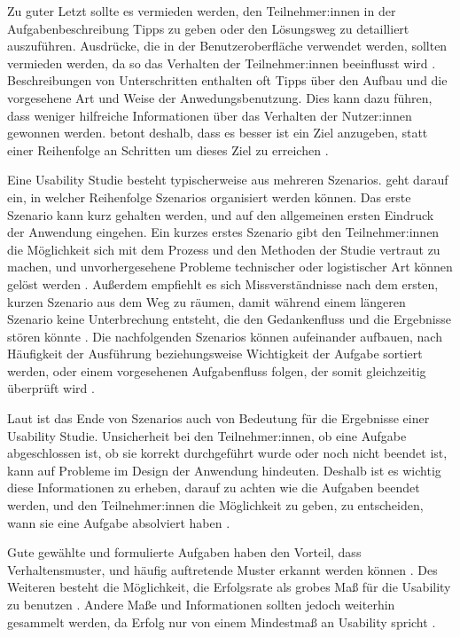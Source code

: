 Zu guter Letzt sollte es vermieden werden, den Teilnehmer:innen in der Aufgabenbeschreibung Tipps zu geben oder den Lösungsweg zu detailliert auszuführen. Ausdrücke, die in der Benutzeroberfläche verwendet werden, sollten vermieden werden, da so das Verhalten der Teilnehmer:innen beeinflusst wird \parencite{mccloskeyTaskScenarios2014, barnumUsabilityTesting2021}. Beschreibungen von Unterschritten enthalten oft Tipps über den Aufbau und die vorgesehene Art und Weise der Anwedungsbenutzung. Dies kann dazu führen, dass weniger hilfreiche Informationen über das Verhalten der Nutzer:innen gewonnen werden. \textcite{barnumUsabilityTesting2021} betont deshalb, dass es besser ist ein Ziel anzugeben, statt einer Reihenfolge an Schritten um dieses Ziel zu erreichen \parencite{mccloskeyTaskScenarios2014}.

Eine Usability Studie besteht typischerweise aus mehreren Szenarios. \textcite{barnumUsabilityTesting2021} geht darauf ein, in welcher Reihenfolge Szenarios organisiert werden können. Das erste Szenario kann kurz gehalten werden, und auf den allgemeinen ersten Eindruck der Anwendung eingehen. Ein kurzes erstes Szenario gibt den Teilnehmer:innen die Möglichkeit sich mit dem Prozess und den Methoden der Studie vertraut zu machen, und unvorhergesehene Probleme technischer oder logistischer Art können gelöst werden \parencite{barnumUsabilityTesting2021}. Außerdem empfiehlt es sich Missverständnisse nach dem ersten, kurzen Szenario aus dem Weg zu räumen, damit während einem längeren Szenario keine Unterbrechung entsteht, die den Gedankenfluss und die Ergebnisse stören könnte \parencite{barnumUsabilityTesting2021}. Die nachfolgenden Szenarios können aufeinander aufbauen, nach Häufigkeit der Ausführung beziehungsweise Wichtigkeit der Aufgabe sortiert werden, oder einem vorgesehenen Aufgabenfluss folgen, der somit gleichzeitig überprüft wird \parencite{barnumUsabilityTesting2021}.

Laut \textcite{barnumUsabilityTesting2021} ist das Ende von Szenarios auch von Bedeutung für die Ergebnisse einer Usability Studie. Unsicherheit bei den Teilnehmer:innen, ob eine Aufgabe abgeschlossen ist, ob sie korrekt durchgeführt wurde oder noch nicht beendet ist, kann auf Probleme im Design der Anwendung hindeuten. Deshalb ist es wichtig diese Informationen zu erheben, darauf zu achten wie die Aufgaben beendet werden, und den Teilnehmer:innen die Möglichkeit zu geben, zu entscheiden, wann sie eine Aufgabe absolviert haben \parencite{barnumUsabilityTesting2021}.

Gute gewählte und formulierte Aufgaben haben den Vorteil, dass Verhaltensmuster, und häufig auftretende Muster erkannt werden können \parencite{barnumUsabilityTesting2021}. Des Weiteren besteht die Möglichkeit, die Erfolgsrate als grobes Maß für die Usability zu benutzen \parencite{nielsenSuccessRate2001}. Andere Maße und Informationen sollten jedoch weiterhin gesammelt werden, da Erfolg nur von einem Mindestmaß an Usability spricht \parencite{nielsenSuccessRate2001}.
